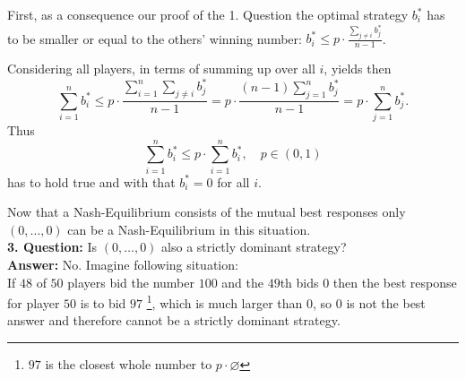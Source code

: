 \begin{example}
	First, as a consequence our proof of the 1. Question the optimal strategy $b_{i}^{*}$ has to be smaller or equal to the others' winning number: $b_{i}^{*} \leq p \cdot \frac{\sum_{j \neq i} b_{j}^{*}}{n - 1}$.
	
	Considering all players, in terms of summing up over all $i$, yields then
	\[ \sum_{i = 1}^{n} b_{i}^{*} \leq p \cdot \frac{\sum_{i = 1}^{n} \sum_{j \neq i} b_{j}^{*}}{n - 1} = p \cdot \frac{(n - 1) \sum_{j = 1}^{n} b_{j}^{*}}{n - 1} = p \cdot \sum_{j = 1}^{n} b_{j}^{*}. \]
	Thus
		\[ \sum_{i = 1}^{n} b_{i}^{*} \leq p \cdot \sum_{i = 1}^{n} b_{i}^{*}, \quad p \in (0, 1) \]
	has to hold true and with that $b_{i}^{*} = 0$ for all $i$.
	
	Now that a Nash-Equilibrium consists of the mutual best responses only $(0, \dotsc,  0)$ can be a Nash-Equilibrium in this situation. \\

	\textbf{3. Question:} Is $(0, \dotsc, 0)$ also a strictly dominant strategy? \\
	\textbf{Answer:} No. Imagine following situation: \\
	If $48$ of $50$ players bid the number $100$ and the $49$th bids $0$ then the best response for player $50$ is to bid $97$ \footnote{$97$ is the closest whole number to $p \cdot \varnothing$}, which is much larger than 0, so $0$ is not the best answer and therefore cannot be a strictly dominant strategy.
\end{example}


\newpage